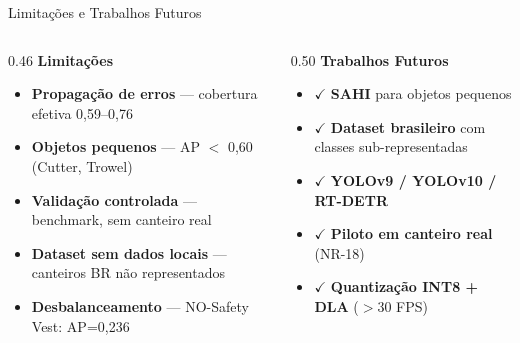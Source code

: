\begin{frame}{Limitações e Trabalhos Futuros}
  \vspace{-2mm}
  \begin{columns}[t]
    \begin{column}{0.46\textwidth}
      {\small\textcolor{skipcolor}{\textbf{Limitações}}}
      \vspace{1mm}
      \begin{itemize}\setlength{\itemsep}{0.5mm}\scriptsize
        \item \textbf{Propagação de erros} --- cobertura efetiva 0,59--0,76
        \item \textbf{Objetos pequenos} --- AP $<$ 0,60 (Cutter, Trowel)
        \item \textbf{Validação controlada} --- benchmark, sem canteiro real
        \item \textbf{Dataset sem dados locais} --- canteiros BR não representados
        \item \textbf{Desbalanceamento} --- NO-Safety Vest: AP=0,236
      \end{itemize}
    \end{column}
    \begin{column}{0.50\textwidth}
      {\small\textcolor{headcolor}{\textbf{Trabalhos Futuros}}}
      \vspace{1mm}
      \begin{itemize}\setlength{\itemsep}{0.5mm}\scriptsize
        \item \textcolor{headcolor}{$\checkmark$} \textbf{SAHI} para objetos pequenos
        \item \textcolor{headcolor}{$\checkmark$} \textbf{Dataset brasileiro} com classes sub-representadas
        \item \textcolor{headcolor}{$\checkmark$} \textbf{YOLOv9 / YOLOv10 / RT-DETR}
        \item \textcolor{headcolor}{$\checkmark$} \textbf{Piloto em canteiro real} (NR-18)
        \item \textcolor{headcolor}{$\checkmark$} \textbf{Quantização INT8 + DLA} ($>$30 FPS)
      \end{itemize}
    \end{column}
  \end{columns}
  \vfill
\end{frame}


